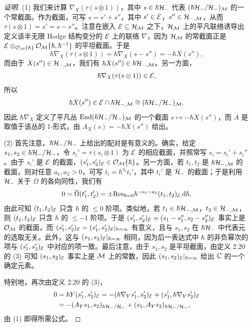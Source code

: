 \begin{proof}[证明]
(1) 我们来计算 $\nabla_X(\tau(s\otimes1))$，其中 $s\in\hbar\mathcal{H}_-$ 代表 $(\hbar\mathcal{H}_-/\mathcal{H}_-)_{\mathcal{M}}$ 的一个常截面。作为截面，可写 $s=s'+s''$，其中 $s'\in\mathcal{E}$，$s''\in\mathcal{H}_{-,\mathcal{M}}$，从而 $\tau(s\otimes1)=s'=s-s''$。注意在嵌入 $\mathcal{E}\subseteq\mathcal{H}_{\mathcal{M}}$ 之下，$\mathcal{H}_{\mathcal{M}}$ 上的平凡联络诱导出定义该半无限 Hodge 结构变分的 $\mathcal{E}$ 上的联络 $\nabla$，因为 $\mathcal{H}_{\mathcal{M}}$ 的常截面正是 $\mathcal{E}\otimes_{\mathcal{O}_{\mathcal{M}}\{\hbar\}}\mathcal{O}_{\mathcal{M}}\{\hbar,\hbar^{-1}\}$ 的平坦截面。于是
\[
\hbar\nabla_X(\tau(s\otimes1))=\hbar\nabla_X(s-s'')=-\hbar X(s''),
\]
而由于 $X(s'')\in\mathcal{H}_{-,\mathcal{M}}$，我们有 $\hbar X(s'')\in\hbar\mathcal{H}_{-,\mathcal{M}}$。另一方面，
\[
\hbar\nabla_X(\tau(s\otimes1))\in\mathcal{E},
\]
所以
\[
\hbar X(s'')\in\mathcal{E}\cap\hbar\mathcal{H}_{-,\mathcal{M}}\cong(\hbar\mathcal{H}_-/\mathcal{H}_-)_{\mathcal{M}}.
\]
因此 $\hbar\nabla_X$ 定义了平凡丛 $\mathrm{End}(\hbar\mathcal{H}_-/\mathcal{H}_-)_{\mathcal{M}}$ 的一个截面 $s\mapsto-\hbar X(s'')$，而 $A$ 是取值于该丛的 1-形式，由 $A_X(s)=-\hbar X(s'')$ 给出。

(2) 首先注意，$\hbar\mathcal{H}_-/\mathcal{H}_-$ 上给出的配对是有意义的。确实，给定 $s_1,s_2\in\hbar\mathcal{H}_-/\mathcal{H}_-$，令 $s_i'=\tau(s_i\otimes1)$ 为 $\mathcal{E}$ 的相应截面，并照常写 $s_i=s_i'+s_i''$。由于 $s_i'$ 是 $\mathcal{E}$ 的截面，$(s_1',s_2')_{\mathcal{E}}\in\mathcal{O}_{\mathcal{M}}\{\hbar\}$。另一方面，若 $t_1,t_2$ 是 $\hbar\mathcal{H}_{-,\mathcal{M}}$ 的截面，则对任意 $a_1,a_2>0$，可写 $t_i=\hbar^{a_i}t_i'$，其中 $t_i'$ 是 $\mathcal{H}_-$ 的截面；于是利用 $\mathcal{H}_-$ 关于 $\overline{\Omega}$ 的各向同性，我们有
\[
0=\overline{\Omega}(t_1',t_2')=\pm\mathrm{Res}_{\hbar=0}\hbar^{-a_1-a_2}(t_1,t_2)_{\mathcal{E}}\,\mathrm{d}\hbar,
\]
由此可知 $(t_1,t_2)_{\mathcal{E}}$ 只含 $\hbar$ 的 $\le0$ 阶项。类似地，若 $t_1\in\hbar\mathcal{H}_{-,\mathcal{M}}$，$t_2\in\mathcal{H}_{-,\mathcal{M}}$，则 $(t_1,t_2)_{\mathcal{E}}$ 只含 $\hbar$ 的 $\le-1$ 阶项。于是 $(s_1',s_2')_{\mathcal{E}}=(s_1-s_1'',s_2-s_2'')_{\mathcal{E}}$ 事实上是 $\mathcal{O}_{\mathcal{M}}$ 的截面，而 $(s_1',s_2')_{\mathcal{E}}=(s_1',s_2')_{\mathcal{E}}|_{\hbar=\infty}$ 有意义，且与 $s_1,s_2$ 在 $\hbar\mathcal{H}_-$ 中代表元的选取无关。此外，这与 $(s_1,s_2)_{\mathcal{E}}|_{\hbar=\infty}$ 相同，因为后一表达式中 $\hbar$ 的非负幂次的项与 $(s_1',s_2')_{\mathcal{E}}$ 中对应的项一致。最后注意，由于 $s_1,s_2$ 是平坦截面，由定义 2.20 的 (3) 可知 $(s_1,s_2)_{\mathcal{E}}$ 事实上是 $\mathcal{M}$ 上的常数，因此 $(s_1,s_2)_{\mathcal{E}}|_{\hbar=\infty}$ 给出 $\mathbb{C}$ 的一个确定元素。

特别地，再次由定义 2.20 的 (3)，
\begin{align*}
0 &= \hbar Y(s_1',s_2')_{\mathcal{E}}=-(\hbar\nabla_Y s_1',s_2')_{\mathcal{E}}+(s_1',\hbar\nabla_Y s_2')_{\mathcal{E}}\\
&= -(A_Ys_1,s_2)_{\hbar\mathcal{H}_-/\mathcal{H}_-}+(s_1,A_Ys_2)_{\hbar\mathcal{H}_-/\mathcal{H}_-},
\end{align*}
由 (1) 即得所需公式。


\end{proof}
